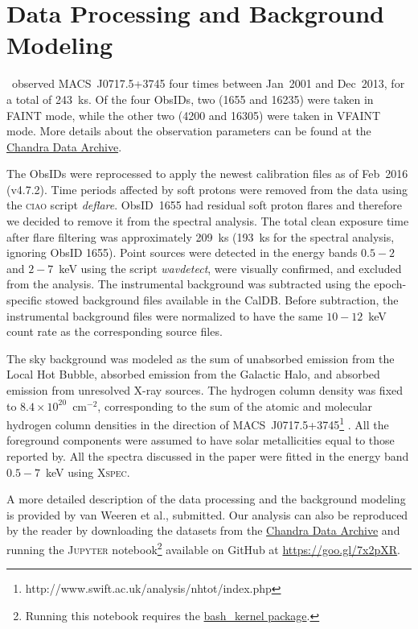 \section{Data Processing and Background Modeling}
\label{sec:DataAnalysis}

\chandra\ observed MACS~J0717.5+3745 four times between Jan~2001 and Dec~2013, for a total of 243~ks. Of the four ObsIDs, two (1655 and 16235) were taken in FAINT mode, while the other two (4200 and 16305) were taken in VFAINT mode. More details about the observation parameters can be found at the \href{http://cda.harvard.edu/chaser/}{Chandra Data Archive}.

The ObsIDs were reprocessed to apply the newest calibration files as of Feb~2016 (v4.7.2). Time periods affected by soft protons were removed from the data using the \textsc{ciao} script \emph{deflare}. ObsID~1655 had residual soft proton flares and therefore we decided to remove it from the spectral analysis. The total clean exposure time after flare filtering was approximately 209~ks (193~ks for the spectral analysis, ignoring ObsID 1655). Point sources were detected in the energy bands $0.5-2$ and $2-7$~keV using the script \emph{wavdetect}, were visually confirmed, and excluded from the analysis. The instrumental background was subtracted using the epoch-specific stowed background files available in the CalDB. Before subtraction, the instrumental background files were normalized to have the same $10-12$~keV count rate as the corresponding source files. 

The sky background was modeled as the sum of unabsorbed emission from the Local Hot Bubble, absorbed emission from the Galactic Halo, and absorbed emission from unresolved X-ray sources. The hydrogen column density was fixed to $8.4\times 10^{20}$~cm$^{-2}$, corresponding to the sum of the atomic and molecular hydrogen column densities in the direction of MACS~J0717.5+3745\footnote{http://www.swift.ac.uk/analysis/nhtot/index.php} \citep{Kalberla2005, Willingale2013}. All the foreground components were assumed to have solar metallicities equal to those reported by\citet{Feldman1992}. All the spectra discussed in the paper were fitted in the energy band $0.5-7$~keV using \textsc{Xspec}.

A more detailed description of the data processing and the background modeling is provided by van Weeren et al., submitted. Our analysis can also be reproduced by the reader by downloading the datasets from the \href{http://cda.harvard.edu/chaser/}{Chandra Data Archive} and running the \textsc{Jupyter} notebook\footnote{Running this notebook requires the \href{https://github.com/takluyver/bash\_kernel}{bash\_kernel package}.} available on GitHub at \url{https://goo.gl/7x2pXR}. 
